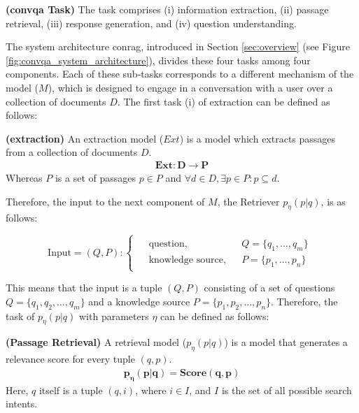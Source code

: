 \begin{definition}
    \textbf{(\gls{convqa} Task)} The task comprises (i) information extraction, (ii) passage retrieval, (iii) response generation, and (iv) question understanding.
    \label{def:task}
\end{definition}

The system architecture \gls{conrag}, introduced in Section \ref{sec:overview} (see Figure \ref{fig:convqa_system_architecture}), divides these four tasks among four components. Each of these sub-tasks corresponds to a different mechanism of the model ($M$), which is designed to engage in a conversation with a user over a collection of documents $D$. The first task (i) of extraction can be defined as follows:

\begin{definition}
    \textbf{(extraction)} An extraction model ($Ext$) is a model which extracts passages from a collection of documents $D$.
    \begin{align*}
        \mathbf{Ext: D \rightarrow P}
    \end{align*} 
    Whereas $P$ is a set of passages $p \in P$ and $\forall d \in D, \exists p \in P : p \subseteq d$.
    \label{def:extraction}
\end{definition}

Therefore, the input to the next component of $M$, the Retriever $p_\eta(p|q)$, is as follows:

\begin{equation}
    \text{Input} = (Q, P) :
    \begin{cases}
        \begin{aligned}
            &\text{question}, && Q = \{q_1, \ldots, q_m\} \\
            &\text{knowledge source}, && P = \{p_1, \ldots, p_n\}
        \end{aligned}
    \end{cases}
\end{equation}

This means that the input is a tuple $(Q,P)$ consisting of a set of questions $Q = \{q_1, q_2, \ldots, q_m\}$ and a knowledge source $P = \{p_1, p_2, \ldots, p_n\}$. Therefore, the task of $p_\eta(p|q)$ with parameters $\eta$ can be defined as follows:

\begin{definition}
    \textbf{(Passage Retrieval)} A retrieval model ($p_\eta(p|q)$) is a model that generates a relevance score for every tuple $(q,p)$.
    \begin{align*}
        \mathbf{p_\eta(p|q) = Score(q,p)}
    \end{align*}
    Here, $q$ itself is a tuple $(q,i)$, where $i \in I$, and $I$ is the set of all possible search intents. 
    \label{def:retrieval}
\end{definition}

